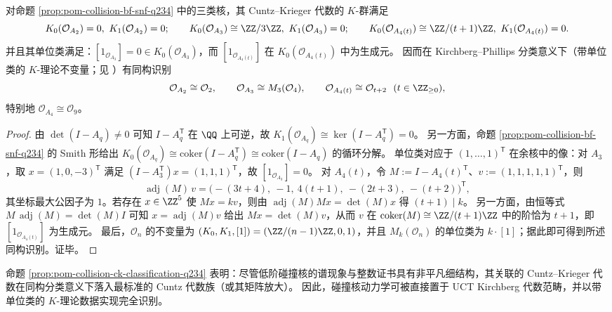 

\begin{proposition}\label{prop:pom-collision-ck-classification-q234}
对命题 \ref{prop:pom-collision-bf-snf-q234} 中的三类核，其 Cuntz--Krieger 代数的 \(K\)-群满足
\[
K_0(\mathcal O_{A_2})=0,\ K_1(\mathcal O_{A_2})=0;\qquad
K_0(\mathcal O_{A_3})\cong \ZZ/3\ZZ,\ K_1(\mathcal O_{A_3})=0;\qquad
K_0(\mathcal O_{A_4(t)})\cong \ZZ/(t+1)\ZZ,\ K_1(\mathcal O_{A_4(t)})=0.
\]
并且其单位类满足：\([1_{\mathcal O_{A_3}}]=0\in K_0(\mathcal O_{A_3})\)，而 \([1_{\mathcal O_{A_4(t)}}]\) 在 \(K_0(\mathcal O_{A_4(t)})\) 中为生成元。
因而在 Kirchberg--Phillips 分类意义下（带单位类的 \(K\)-理论不变量；见 \cite{Phillips2000ClassificationPurelyInfinite}）有同构识别
\[
\mathcal O_{A_2}\cong \mathcal O_2,\qquad
\mathcal O_{A_3}\cong M_3(\mathcal O_4),\qquad
\mathcal O_{A_4(t)}\cong \mathcal O_{t+2}\ \ (t\in\ZZ_{\ge 0}),
\]
特别地 \(\mathcal O_{A_4}\cong \mathcal O_9\)。
\end{proposition}
\begin{proof}
由 \(\det(I-A_q)\neq 0\) 可知 \(I-A_q^\mathsf T\) 在 \(\QQ\) 上可逆，故 \(K_1(\mathcal O_{A_q})\cong\ker(I-A_q^\mathsf T)=0\)。
另一方面，命题 \ref{prop:pom-collision-bf-snf-q234} 的 Smith 形给出
\(
K_0(\mathcal O_{A_q})\cong\mathrm{coker}(I-A_q^\mathsf T)\cong\mathrm{coker}(I-A_q)
\)
的循环分解。
单位类对应于 \((1,\dots,1)^{\mathsf T}\) 在余核中的像：对 \(A_3\)，取 \(x=(1,0,-3)^{\mathsf T}\) 满足
\(
(I-A_3^\mathsf T)x=(1,1,1)^{\mathsf T}
\)，故 \([1_{\mathcal O_{A_3}}]=0\)。
对 \(A_4(t)\)，令 \(M:=I-A_4(t)^\mathsf T\)、\(v:=(1,1,1,1,1)^{\mathsf T}\)，则
\[
\operatorname{adj}(M)\,v=\bigl(-(3t+4),\ -1,\ 4(t+1),\ -(2t+3),\ -(t+2)\bigr)^{\mathsf T},
\]
其坐标最大公因子为 \(1\)。若存在 \(x\in\ZZ^{5}\) 使 \(Mx=kv\)，则由 \(\operatorname{adj}(M)Mx=\det(M)x\) 得 \((t+1)\mid k\)。
另一方面，由恒等式 \(M\,\operatorname{adj}(M)=\det(M)I\) 可知 \(x=\operatorname{adj}(M)v\) 给出 \(Mx=\det(M)v\)，从而 \(v\) 在 \(\mathrm{coker}(M)\cong \ZZ/(t+1)\ZZ\) 中的阶恰为 \(t+1\)，即 \([1_{\mathcal O_{A_4(t)}}]\) 为生成元。
最后，\(\mathcal O_n\) 的不变量为 \((K_0,K_1,[1])=(\ZZ/(n-1)\ZZ,0,1)\)，并且 \(M_k(\mathcal O_n)\) 的单位类为 \(k\cdot [1]\)；据此即可得到所述同构识别。证毕。
\end{proof}

\begin{remark}[算子代数分类中的标准化塌缩]\label{rem:pom-collision-ck-standardization}
命题 \ref{prop:pom-collision-ck-classification-q234} 表明：尽管低阶碰撞核的谱现象与整数证书具有非平凡细结构，其关联的 Cuntz--Krieger 代数在同构分类意义下落入最标准的 Cuntz 代数族（或其矩阵放大）。
因此，碰撞核动力学可被直接置于 UCT Kirchberg 代数范畴，并以带单位类的 \(K\)-理论数据实现完全识别。
\end{remark}

